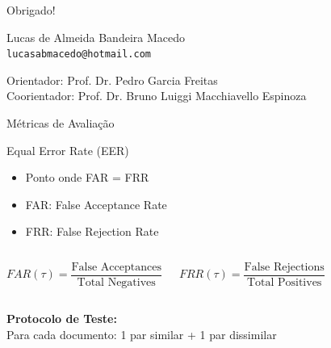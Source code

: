 \begin{frame}[plain]
\begin{center}
{\Huge Obrigado!}

\vspace{1cm}


Lucas de Almeida Bandeira Macedo\\
\texttt{lucasabmacedo@hotmail.com}

\vspace{0.5cm}

Orientador: Prof. Dr. Pedro Garcia Freitas\\
Coorientador: Prof. Dr. Bruno Luiggi Macchiavello Espinoza
\end{center}
\end{frame}


\begin{frame}{Métricas de Avaliação}
\begin{block}{Equal Error Rate (EER)}
\begin{itemize}
    \item Ponto onde FAR = FRR
    \item FAR: False Acceptance Rate
    \item FRR: False Rejection Rate
\end{itemize}
\end{block}

\begin{columns}
\begin{equation*}
FAR(\tau) = \frac{\text{False Acceptances}}{\text{Total Negatives}}
\end{equation*}

\begin{equation*}
FRR(\tau) = \frac{\text{False Rejections}}{\text{Total Positives}}
\end{equation*}
\end{columns}

\vspace{0.3cm}
\begin{center}
\textbf{Protocolo de Teste:}\\
Para cada documento: 1 par similar + 1 par dissimilar
\end{center}
\end{frame}

